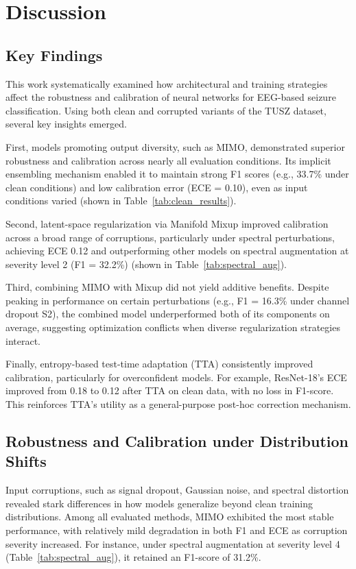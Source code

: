 \chapter{Discussion}
\label{ch:discussion}
\section{Key Findings}
This work systematically examined how architectural and training strategies affect the robustness and calibration of neural networks for EEG-based seizure classification. Using both clean and corrupted variants of the TUSZ dataset, several key insights emerged.

First, models promoting output diversity, such as MIMO, demonstrated superior robustness and calibration across nearly all evaluation conditions. Its implicit ensembling mechanism enabled it to maintain strong F1 scores (e.g., 33.7\% under clean conditions) and low calibration error (ECE = 0.10), even as input conditions varied (shown in Table~\ref{tab:clean_results}).

Second, latent-space regularization via Manifold Mixup improved calibration across a broad range of corruptions, particularly under spectral perturbations, achieving ECE 0.12 and outperforming other models on spectral augmentation at severity level 2 (F1 = 32.2\%) (shown in Table~\ref{tab:spectral_aug}).

Third, combining MIMO with Mixup did not yield additive benefits. Despite peaking in performance on certain perturbations (e.g., F1 = 16.3\% under channel dropout S2), the combined model underperformed both of its components on average, suggesting optimization conflicts when diverse regularization strategies interact.

Finally, entropy-based test-time adaptation (TTA) consistently improved calibration, particularly for overconfident models. For example, ResNet-18’s ECE improved from 0.18 to 0.12 after TTA on clean data, with no loss in F1-score. This reinforces TTA’s utility as a general-purpose post-hoc correction mechanism.

\section{Robustness and Calibration under Distribution Shifts}
Input corruptions, such as signal dropout, Gaussian noise, and spectral distortion revealed stark differences in how models generalize beyond clean training distributions. Among all evaluated methods, MIMO exhibited the most stable performance, with relatively mild degradation in both F1 and ECE as corruption severity increased. For instance, under spectral augmentation at severity level 4 (Table~\ref{tab:spectral_aug}), it retained an F1-score of 31.2\%.

